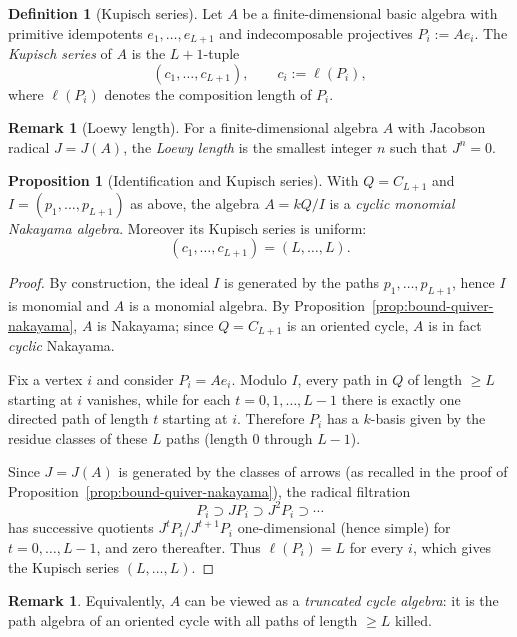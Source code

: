 \documentclass{article}
\theoremstyle{definition}
\newtheorem{proposition}[theorem]{Proposition}
\newtheorem{definition}[theorem]{Definition}
\newtheorem{remark}[theorem]{Remark}
\begin{document}
\begin{definition}[Kupisch series]
Let $A$ be a finite-dimensional basic algebra with primitive idempotents $e_1,\ldots,e_{L+1}$ and indecomposable projectives
$P_i:=Ae_i$.
The \emph{Kupisch series} of $A$ is the $L+1$-tuple
\[
(c_1,\ldots,c_{L+1}),\qquad c_i:=\ell(P_i),
\]
where $\ell(P_i)$ denotes the composition length of $P_i$.
\end{definition}

\begin{remark}[Loewy length]
For a finite-dimensional algebra $A$ with Jacobson radical $J=J(A)$, the \emph{Loewy length} is the smallest integer $n$ such that $J^n=0$.
\end{remark}

\begin{proposition}[Identification and Kupisch series]
With $Q=C_{L+1}$ and $I=(p_1,\ldots,p_{L+1})$ as above, the algebra $A=kQ/I$ is a \emph{cyclic monomial Nakayama algebra}.
Moreover its Kupisch series is uniform:
\[
(c_1,\ldots,c_{L+1})=(L,\ldots,L).
\]
\end{proposition}

\begin{proof}
By construction, the ideal $I$ is generated by the paths $p_1,\ldots,p_{L+1}$, hence $I$ is monomial and $A$ is a monomial algebra.
By Proposition~\ref{prop:bound-quiver-nakayama}, $A$ is Nakayama; since $Q=C_{L+1}$ is an oriented cycle, $A$ is in fact \emph{cyclic} Nakayama.

Fix a vertex $i$ and consider $P_i=Ae_i$.
Modulo $I$, every path in $Q$ of length $\ge L$ starting at $i$ vanishes, while for each $t=0,1,\ldots,L-1$ there is exactly one directed path of length $t$ starting at $i$.
Therefore $P_i$ has a $k$-basis given by the residue classes of these $L$ paths (length $0$ through $L-1$).

Since $J=J(A)$ is generated by the classes of arrows (as recalled in the proof of Proposition~\ref{prop:bound-quiver-nakayama}), the radical filtration
\[
P_i \supset JP_i \supset J^2P_i \supset \cdots
\]
has successive quotients $J^tP_i/J^{t+1}P_i$ one-dimensional (hence simple) for $t=0,\ldots,L-1$, and zero thereafter.
Thus $\ell(P_i)=L$ for every $i$, which gives the Kupisch series $(L,\ldots,L)$.
\end{proof}

\begin{remark}
Equivalently, $A$ can be viewed as a \emph{truncated cycle algebra}: it is the path algebra of an oriented cycle with all paths of length $\ge L$ killed.
\end{remark}
\end{document}
